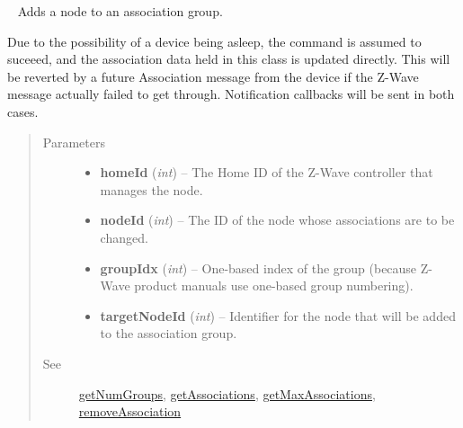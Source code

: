 \documentclass[letterpaper,10pt,english]{sphinxmanual}
\begin{document}
\begin{fulllineitems}
\begin{fulllineitems}
\begin{quote}
\begin{description}
\end{description}\end{quote}

\end{fulllineitems}


\begin{fulllineitems}
\label{libopenzwave:libopenzwave.PyManager.addAssociation}~\label{libopenzwave:addassociation}
Adds a node to an association group.

Due to the possibility of a device being asleep, the command is assumed to
suceeed, and the association data held in this class is updated directly.  This
will be reverted by a future Association message from the device if the Z-Wave
message actually failed to get through.  Notification callbacks will be sent in
both cases.
\begin{quote}\begin{description}
\item[{Parameters}] \leavevmode\begin{itemize}
\item {} 
\textbf{homeId} (\emph{int}) -- The Home ID of the Z-Wave controller that manages the node.

\item {} 
\textbf{nodeId} (\emph{int}) -- The ID of the node whose associations are to be changed.

\item {} 
\textbf{groupIdx} (\emph{int}) -- One-based index of the group (because Z-Wave product manuals use one-based group numbering).

\item {} 
\textbf{targetNodeId} (\emph{int}) -- Identifier for the node that will be added to the association group.

\end{itemize}

\item[{See}] \leavevmode
{\hyperref[libopenzwave:getnumgroups]{getNumGroups}}, {\hyperref[libopenzwave:getassociations]{getAssociations}}, {\hyperref[libopenzwave:getmaxassociations]{getMaxAssociations}}, {\hyperref[libopenzwave:removeassociation]{removeAssociation}}

\end{description}\end{quote}


\end{fulllineitems}
\end{fulllineitems}
\end{document}
